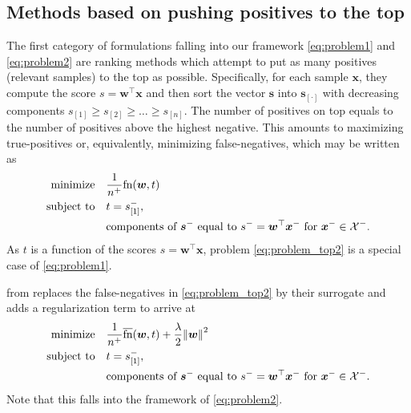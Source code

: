 \subsection{Methods based on pushing positives to the top}\label{sec:obj1}

The first category of formulations falling into our framework \eqref{eq:problem1} and \eqref{eq:problem2} are ranking methods which attempt to put as many positives (relevant samples) to the top as possible. Specifically, for each sample $\bm{x}$, they compute the score $s = \bm{w}^\top \bm{x}$ and then sort the vector $\bm{s}$ into $\bm{s}_{[\cdot]}$ with decreasing components $s_{[1]} \ge s_{[2]} \ge \dots \ge s_{[n]}$. The number of positives on top equals to the number of positives above the highest negative. This amounts to maximizing true-positives or, equivalently, minimizing false-negatives, which may be written as
\begin{equation}\label{eq:problem_top2}
  \begin{aligned}
    \operatorname*{minimize}_{}
    & \quad\frac{1}{n^{+}}\textnormal{fn}(\bm{w},t) \\
    \operatorname{subject\ to}
    & \quad t = s_{[1]}^-, \\
    & \quad \text{components of }\bm{s}^- \text{ equal to } s^- = \bm{w}^\top \bm{x}^-\text{ for }\bm{x}^- \in \mathcal{X}^-.
  \end{aligned}
\end{equation}
As $t$ is a function of the scores $s = \bm{w}^\top \bm{x}$, problem \eqref{eq:problem_top2} is a special case of \eqref{eq:problem1}.

\TopPush from \cite{li2014top} replaces the false-negatives in \eqref{eq:problem_top2} by their surrogate and adds a regularization term to arrive at
\begin{equation}\label{eq:problem_toppush}
  \begin{aligned}
    \minimize
    & \quad \frac{1}{n^{+}} \fns(\bm{w}, t) + \frac{\lambda}{2} \norm{\bm{w}}^2 \\
    \st
    & \quad t = s_{[1]}^-, \\
    & \quad \text{components of }\bm{s}^-\text{ equal to } s^- = \bm{w}^\top \bm{x}^- \text{ for }\bm{x}^- \in \Xc^-.
  \end{aligned}
\end{equation}
Note that this falls into the framework of \eqref{eq:problem2}.

